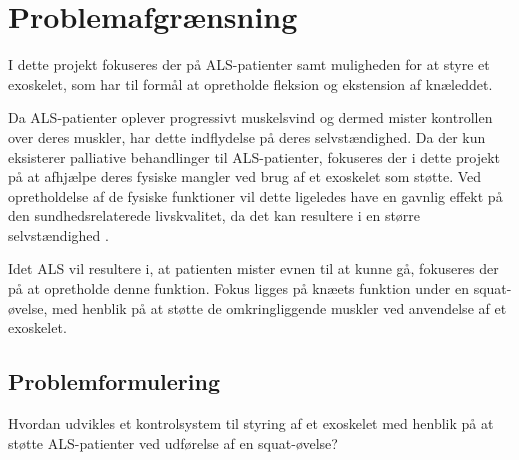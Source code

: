\section{Problemafgrænsning}
I dette projekt fokuseres der på ALS-patienter samt muligheden for at styre et exoskelet, som har til formål at opretholde fleksion og ekstension af knæleddet. 

Da ALS-patienter oplever progressivt muskelsvind og dermed mister kontrollen over deres muskler, har dette indflydelse på deres selvstændighed. Da der kun eksisterer palliative behandlinger til ALS-patienter, fokuseres der i dette projekt på at afhjælpe deres fysiske mangler ved brug af et exoskelet som støtte.
Ved opretholdelse af de fysiske funktioner vil dette ligeledes have en gavnlig effekt på den sundhedsrelaterede livskvalitet, da det kan resultere i en større selvstændighed \citep{ilse2015, tramonti2012}.%

Idet ALS vil resultere i, at patienten mister evnen til at kunne gå, fokuseres der på at opretholde denne funktion. Fokus ligges på knæets funktion under en squat-øvelse, med henblik på at støtte de omkringliggende muskler ved anvendelse af et exoskelet.

\subsection{Problemformulering}

Hvordan udvikles et kontrolsystem til styring af et exoskelet med henblik på at støtte ALS-patienter ved udførelse af en squat-øvelse?